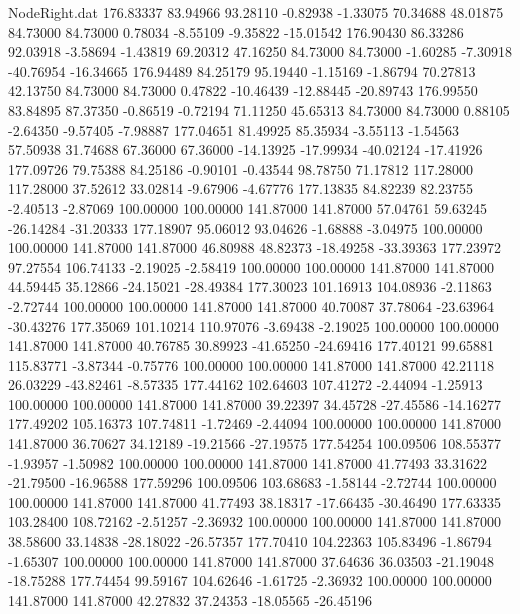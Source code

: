 \begin{filecontents}{NodeRight.dat}
 176.83337   83.94966   93.28110    -0.82938   -1.33075   70.34688   48.01875   84.73000   84.73000    0.78034   -8.55109   -9.35822  -15.01542
 176.90430   86.33286   92.03918    -3.58694   -1.43819   69.20312   47.16250   84.73000   84.73000   -1.60285   -7.30918  -40.76954  -16.34665
 176.94489   84.25179   95.19440    -1.15169   -1.86794   70.27813   42.13750   84.73000   84.73000    0.47822  -10.46439  -12.88445  -20.89743
 176.99550   83.84895   87.37350    -0.86519   -0.72194   71.11250   45.65313   84.73000   84.73000    0.88105   -2.64350   -9.57405   -7.98887
 177.04651   81.49925   85.35934    -3.55113   -1.54563   57.50938   31.74688   67.36000   67.36000  -14.13925  -17.99934  -40.02124  -17.41926
 177.09726   79.75388   84.25186    -0.90101   -0.43544   98.78750   71.17812  117.28000  117.28000   37.52612   33.02814   -9.67906   -4.67776
 177.13835   84.82239   82.23755    -2.40513   -2.87069  100.00000  100.00000  141.87000  141.87000   57.04761   59.63245  -26.14284  -31.20333
 177.18907   95.06012   93.04626    -1.68888   -3.04975  100.00000  100.00000  141.87000  141.87000   46.80988   48.82373  -18.49258  -33.39363
 177.23972   97.27554  106.74133    -2.19025   -2.58419  100.00000  100.00000  141.87000  141.87000   44.59445   35.12866  -24.15021  -28.49384
 177.30023  101.16913  104.08936    -2.11863   -2.72744  100.00000  100.00000  141.87000  141.87000   40.70087   37.78064  -23.63964  -30.43276
 177.35069  101.10214  110.97076    -3.69438   -2.19025  100.00000  100.00000  141.87000  141.87000   40.76785   30.89923  -41.65250  -24.69416
 177.40121   99.65881  115.83771    -3.87344   -0.75776  100.00000  100.00000  141.87000  141.87000   42.21118   26.03229  -43.82461   -8.57335
 177.44162  102.64603  107.41272    -2.44094   -1.25913  100.00000  100.00000  141.87000  141.87000   39.22397   34.45728  -27.45586  -14.16277
 177.49202  105.16373  107.74811    -1.72469   -2.44094  100.00000  100.00000  141.87000  141.87000   36.70627   34.12189  -19.21566  -27.19575
 177.54254  100.09506  108.55377    -1.93957   -1.50982  100.00000  100.00000  141.87000  141.87000   41.77493   33.31622  -21.79500  -16.96588
 177.59296  100.09506  103.68683    -1.58144   -2.72744  100.00000  100.00000  141.87000  141.87000   41.77493   38.18317  -17.66435  -30.46490
 177.63335  103.28400  108.72162    -2.51257   -2.36932  100.00000  100.00000  141.87000  141.87000   38.58600   33.14838  -28.18022  -26.57357
 177.70410  104.22363  105.83496    -1.86794   -1.65307  100.00000  100.00000  141.87000  141.87000   37.64636   36.03503  -21.19048  -18.75288
 177.74454   99.59167  104.62646    -1.61725   -2.36932  100.00000  100.00000  141.87000  141.87000   42.27832   37.24353  -18.05565  -26.45196

\end{filecontents}
